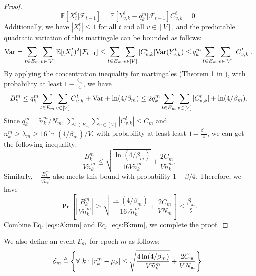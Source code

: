 \begin{proof}
    \[\mathbb{E}[X_i^t|\mathcal{F}_{t-1}] = \mathbb{E}[Y_{v,k}^t - q_k^m|\mathcal{F}_{t-1}] C_{v,k}^t = 0.\]
    Additionally, we have $|X_i^t| \leq 1$ for all $t$ and all $v \in [V]$, and the predictable quadratic variation of this martingale can be bounded as follows:
    \[\mathrm{Var} = \sum_{t \in E_m} \sum_{v\in [V]} \mathbb{E}[(X_i^t)^2|\mathcal{F}_{t-1}] \leq \sum_{t \in E_m}\sum_{v\in [V]}|C_{v,k}^t|\mathrm{Var}(Y_{v,k}^t) \leq q_k^m \sum_{t \in E_m}\sum_{v\in [V]}|C_{v,k}^t|.\]
    By applying the concentration inequality for martingales (Theorem 1 in \cite{beygelzimer2011contextual}), with probability at least $1-\frac{\beta_m}{4}$, we have
    \[B_k^m \leq q_k^m \sum_{t \in E_m}\sum_{v\in [V]} C_{v,k}^t + \mathrm{Var} + \ln(4/\beta_m) \leq 2q_k^m \sum_{t \in E_m}\sum_{v\in [V]}|C_{v,k}^t| + \ln(4/\beta_m).\]
    Since $q_k^m = \widetilde{n}_k^m / N_m$, $\sum_{t \in E_m}\sum_{v\in [V]}|C_{v,k}^t| \leq C_m$ and $n_k^m \geq \lambda_m \geq 16\ln(4/\beta_m) / V$, with probability at least least $1-\frac{\beta_m}{4}$, we can get the following inequality:
    \[\frac{B_k^m}{V \widetilde{n}_k^m} \leq \sqrt{\frac{\ln(4 /\beta_m)}{16V \widetilde{n}_k^m}} + \frac{2C_m}{V \widetilde{n}_k^m}.\]
    Similarly, $-\frac{B_k^m}{V \widetilde{n}_k^m}$ also meets this bound with probability $1 - \beta / 4$. Therefore, we have
    \begin{equation}
    \label{eqs:Bkmm}
        \Pr\left[\left|\frac{B_k^m}{V \widetilde{n}_k^m}\right| \geq \sqrt{\frac{\ln(4 /\beta_m)}{16V \widetilde{n}_k^m}} + \frac{2C_m}{V N_m}\right] \leq \frac{\beta_m}{2}.
    \end{equation}
    Combine Eq. \ref{eqs:Akmm} and Eq. \ref{eqs:Bkmm}, we complete the proof. 
\end{proof}

We also define an event ${\mathcal{E}}_m$ for epoch $m$ as follows:
\begin{equation*}
    {\mathcal{E}}_m \triangleq \left\{ \forall\ k: |r_k^m - \mu_k| \leq \sqrt{\frac{4\ln(4/\beta_m)}{V \widetilde{n}_k^m}} + \frac{2C_m}{VN_m} \right\}.
\end{equation*}

